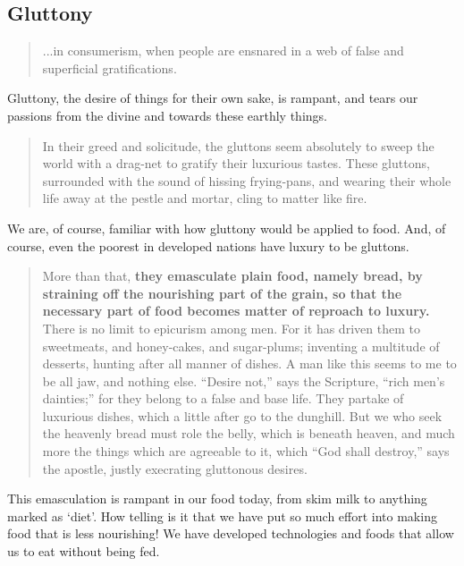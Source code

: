 \documentclass[letterpaper]{article}
\begin{document}
\subsection{Gluttony}

\begin{quote}
  ...in consumerism, when people are ensnared in a web of false and superficial gratifications.
\end{quote}

Gluttony, the desire of things for their own sake, is rampant, and tears our passions from the divine and towards these earthly things.

\begin{quote}
  In their greed and solicitude, the gluttons seem absolutely to sweep the world with a drag-net to gratify their luxurious tastes. These gluttons, surrounded with the sound of hissing frying-pans, and wearing their whole life away at the pestle and mortar, cling to matter like fire. 
\end{quote}

We are, of course, familiar with how gluttony would be applied to food. And, of course, even the poorest in developed nations have luxury to be gluttons.

\begin{quote}
  More than that, \textbf{they emasculate plain food, namely bread, by straining off the nourishing part of the grain, so that the necessary part of food becomes matter of reproach to luxury.} There is no limit to epicurism among men. For it has driven them to sweetmeats, and honey-cakes, and sugar-plums; inventing a multitude of desserts, hunting after all manner of dishes. A man like this seems to me to be all jaw, and nothing else. ``Desire not,'' says the Scripture, ``rich men’s dainties;'' for they belong to a false and base life. They partake of luxurious dishes, which a little after go to the dunghill. But we who seek the heavenly bread must role the belly, which is beneath heaven, and much more the things which are agreeable to it, which “God shall destroy,” says the apostle, justly execrating gluttonous desires.
\end{quote}

This emasculation is rampant in our food today, from skim milk to anything marked as `diet'. How telling is it that we have put so much effort into making food that is less nourishing! We have developed technologies and foods that allow us to eat without being fed.
\end{document}
